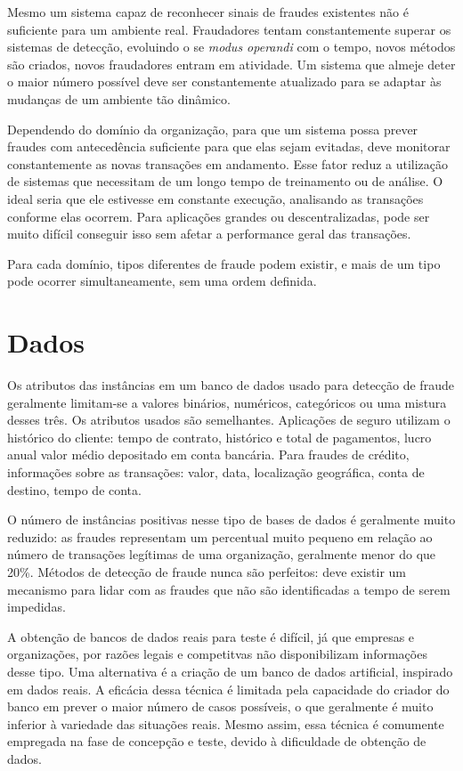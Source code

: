 \documentclass{iiufrgs}
\begin{document}
Mesmo um sistema capaz de reconhecer sinais de fraudes existentes não é suficiente para um ambiente real. Fraudadores tentam constantemente superar os sistemas de detecção, evoluindo o se \emph{modus operandi} com o tempo, novos métodos são criados, novos fraudadores entram em atividade. Um sistema que almeje deter o maior número possível deve ser constantemente atualizado para se adaptar às mudanças de um ambiente tão dinâmico.

Dependendo do domínio da organização, para que um sistema possa prever fraudes com antecedência suficiente para que elas sejam evitadas, deve monitorar constantemente as novas transações em andamento. Esse fator reduz a utilização de sistemas que necessitam de um longo tempo de treinamento ou de análise. O ideal seria que ele estivesse em constante execução, analisando as transações conforme elas ocorrem. Para aplicações grandes ou descentralizadas, pode ser muito difícil conseguir isso sem afetar a performance geral das transações.

Para cada domínio, tipos diferentes de fraude podem existir, e mais de um tipo pode ocorrer simultaneamente, sem uma ordem definida. 

\section{Dados}

Os atributos das instâncias em um banco de dados usado para detecção de fraude geralmente limitam-se a valores binários, numéricos, categóricos ou uma mistura desses três. Os atributos usados são semelhantes. Aplicações de seguro utilizam o histórico do cliente: tempo de contrato, histórico e total de pagamentos, lucro anual valor médio depositado em conta bancária. Para fraudes de crédito, informações sobre as transações: valor, data, localização geográfica, conta de destino, tempo de conta.

O número de instâncias positivas nesse tipo de bases de dados é geralmente muito reduzido: as fraudes representam um percentual muito pequeno em relação ao número de transações legítimas de uma organização, geralmente menor do que 20\%. Métodos de detecção de fraude nunca são perfeitos: deve existir um mecanismo para lidar com as fraudes que não são identificadas a tempo de serem impedidas.

A obtenção de bancos de dados reais para teste é difícil, já que empresas e organizações, por razões legais e competitvas não disponibilizam informações desse tipo. Uma alternativa é a criação de um banco de dados artificial, inspirado em dados reais. A eficácia dessa técnica é limitada pela capacidade do criador do banco em prever o maior número de casos possíveis, o que geralmente é muito inferior à variedade das situações reais. Mesmo assim, essa técnica é comumente empregada na fase de concepção e teste, devido à dificuldade de obtenção de dados.
\end{document}
